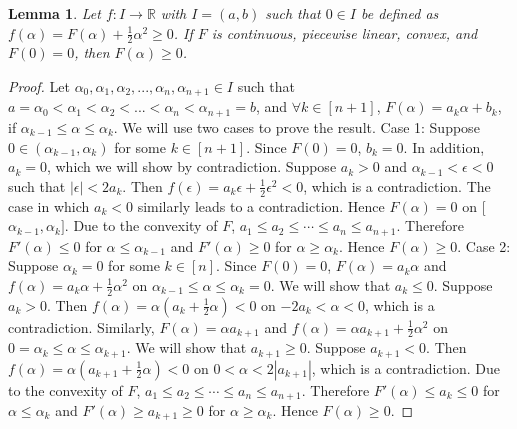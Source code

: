 \documentclass[12pt]{article}
\newtheorem{lemma}[theorem]{Lemma}
\begin{document}
\begin{lemma}
\label{lem:F_greater_0}
    Let $f:I \rightarrow \mathbb{R}$ with $I=(a,b)$ such that $0 \in I$ be defined as $f(\alpha) = F(\alpha) + \frac{1}{2}\alpha^2 \geq 0$.  If $F$ is continuous, piecewise linear, convex, and $F(0)=0$, then $F(\alpha) \geq 0$.
\end{lemma}

\begin{proof}
Let $\alpha_0, \alpha_1, \alpha_2, ..., \alpha_n,\alpha_{n+1} \in I$ such that $a=\alpha_0 < \alpha_1 < \alpha_2 < ... < \alpha_n < \alpha_{n+1}=b$, and $\forall k \in [n+1]$, $F(\alpha) = a_k  \alpha  + b_k$, if $\alpha_{k-1} \leq \alpha \leq \alpha_{k}$.
 We will use two cases to prove the result. \newline
 Case 1: Suppose $0 \in (\alpha_{k-1}, \alpha_{k})$ for some $k \in [n+1]$.  Since $F(0) = 0$, $b_k = 0$.  In addition, $a_k = 0$, which we will show by contradiction.  Suppose $a_k > 0$ and $\alpha_{k-1} < \epsilon < 0$ such that $|\epsilon| < 2a_k$.  Then $f(\epsilon) = a_k \epsilon + \frac{1}{2}\epsilon^2 < 0$, which is a contradiction.  The case in which $a_k < 0$ similarly leads to a contradiction.  Hence $F(\alpha) = 0$ on [$\alpha_{k-1}, \alpha_{k}]$.  Due to the convexity of $F$, $a_1 \leq a_2 \leq \cdots \leq a_n \leq a_{n+1}$. Therefore $F'(\alpha) \leq 0$ for $\alpha \leq \alpha_{k-1}$ and $F'(\alpha) \geq 0$ for $\alpha \geq \alpha_{k}$.  Hence $F(\alpha) \geq 0$. \newline
 Case 2: Suppose $\alpha_k = 0$ for some $k \in [n]$.  Since $F(0)=0$, $F(\alpha) = a_{k} \alpha $ and $f(\alpha) = a_{k} \alpha  + \frac{1}{2}\alpha^2$ on $\alpha_{k-1} \leq \alpha \leq \alpha_{k} = 0$.  We will show that $a_{k} \leq 0$.  Suppose $a_{k} > 0$.  Then $f(\alpha) = \alpha(a_{k} + \frac{1}{2}\alpha) < 0$ on $-2a_{k} < \alpha < 0$, which is a contradiction.  Similarly, $F(\alpha) = \alpha a_{k+1}$ and $f(\alpha) =  \alpha a_{k+1} + \frac{1}{2}\alpha^2$ on $0 = \alpha_{k} \leq \alpha \leq \alpha_{k+1}$.  We will show that $a_{k+1} \geq 0$.  Suppose $a_{k+1} < 0$.  Then $f(\alpha) = \alpha(a_{k+1} + \frac{1}{2}\alpha) < 0$ on $0 < \alpha < 2|a_{k+1}|$, which is a contradiction.  Due to the convexity of $F$, $a_1 \leq a_2 \leq \cdots \leq a_n \leq a_{n+1}$. Therefore $F'(\alpha) \leq a_{k} \leq 0$ for $\alpha \leq \alpha_{k}$ and $F'(\alpha) \geq a_{k+1} \geq 0$ for $\alpha \geq \alpha_{k}$.  Hence $F(\alpha) \geq 0$. 
    
\end{proof}
\end{document}
